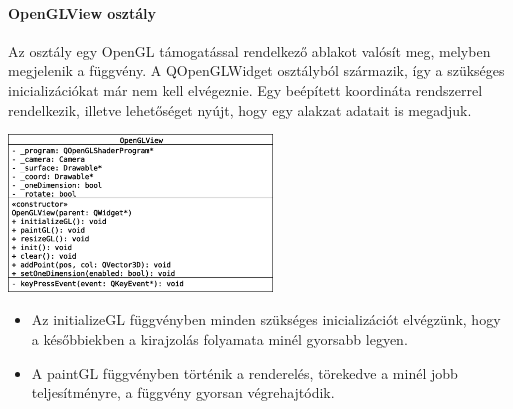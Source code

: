 \documentclass[12pt]{report}
\begin{document}
\paragraph{OpenGLView osztály}
Az osztály egy OpenGL támogatással rendelkező ablakot valósít meg, melyben megjelenik a függvény. A QOpenGLWidget osztályból származik, így a szükséges inicializációkat már nem kell elvégeznie. Egy beépített koordináta rendszerrel rendelkezik, illetve lehetőséget nyújt, hogy egy alakzat adatait is megadjuk.
\begin{center}
\includegraphics[width=7cm]{pics/uml/OpenGLView}
\end{center}
\begin{itemize}
\item Az initializeGL függvényben minden szükséges inicializációt elvégzünk, hogy a későbbiekben a kirajzolás folyamata minél gyorsabb legyen.
\item A paintGL függvényben történik a renderelés, törekedve a minél jobb teljesítményre, a függvény gyorsan végrehajtódik.
\end{itemize}
\end{document}
